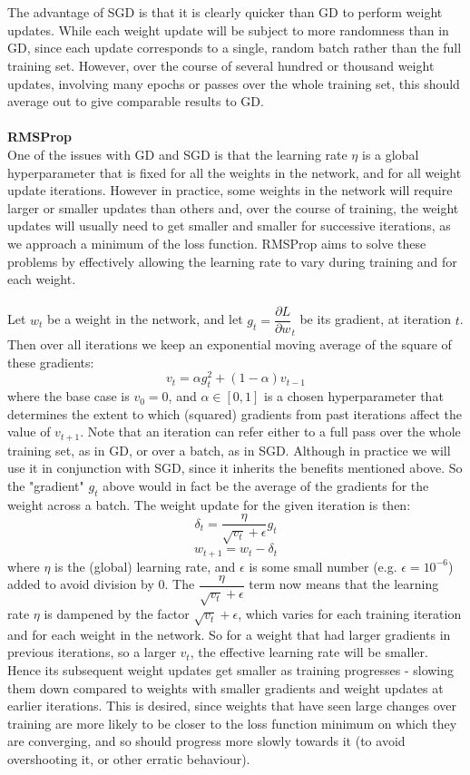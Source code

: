 \documentclass[11pt]{article} %
\theoremstyle{plain}
\theoremstyle{definition}
\begin{document}
\\
\\
\noindent
The advantage of SGD is that it is clearly quicker than GD to perform weight updates. While each weight update will be subject to more randomness than in GD, since each update corresponds to a single, random batch rather than the full training set. However, over the course of several hundred or thousand weight updates, involving many epochs or passes over the whole training set, this should average out to give comparable results to GD. 
\\
\\
\noindent
\textbf{RMSProp}
\\
\noindent
One of the issues with GD and SGD is that the learning rate \(\eta\) is a global hyperparameter that is fixed for all the weights in the network, and for all weight update iterations. However in practice, some weights in the network will require larger or smaller updates than others and, over the course of training, the weight updates will usually need to get smaller and smaller for successive iterations, as we approach a minimum of the loss function. RMSProp aims to solve these problems by effectively allowing the learning rate to vary during training and for each weight.
\\
\\
\noindent
Let \(w_t\) be a weight in the network, and let \(g_t = {\dfrac{\partial L}{\partial w}}_t\) be its gradient, at iteration \(t\). Then over all iterations we keep an exponential moving average of the square of these gradients:
\[ v_t = \alpha g_t^2 + (1-\alpha)v_{t-1} \]
where the base case is \(v_0 = 0\), and \( \alpha \in [0,1]\) is a chosen hyperparameter that determines the extent to which (squared) gradients from past iterations affect the value of \(v_{t+1}\). Note that an iteration can refer either to a full pass over the whole training set, as in GD, or over a batch, as in SGD. Although in practice we will use it in conjunction with SGD, since it inherits the benefits mentioned above. So the "gradient" \(g_t\) above would in fact be the average of the gradients for the weight across a batch. The weight update for the given iteration is then:
\[ \delta_t  = \dfrac{\eta}{\sqrt{v_t} + \epsilon} g_t \]
\[ w_{t+1} = w_t - \delta_t \]
where \(\eta\) is the (global) learning rate, and \(\epsilon\) is some small number (e.g. \(\epsilon=10^{-6}\)) added to avoid division by 0. The \(\dfrac{\eta}{\sqrt{v_t} + \epsilon}\) term now means that the learning rate \(\eta\) is dampened by the factor \(\sqrt{v_t} + \epsilon\), which varies for each training iteration and for each weight in the network. So for a weight that had larger gradients in previous iterations, so a larger \(v_t\), the effective learning rate will be smaller. Hence its subsequent weight updates get smaller as training progresses - slowing them down compared to weights with smaller gradients and weight updates at earlier iterations. This is desired, since weights that have seen large changes over training are more likely to be closer to the loss function minimum on which they are converging, and so should progress more slowly towards it (to avoid overshooting it, or other erratic behaviour).
\end{document}
